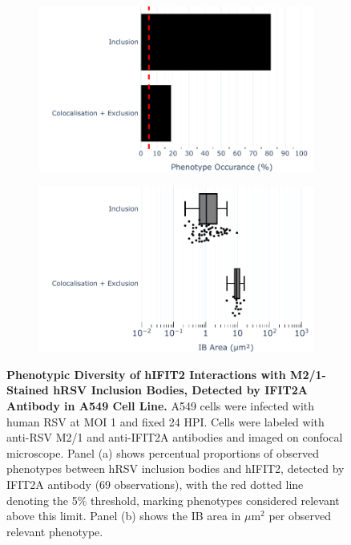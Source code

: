 \begin{figure}
    \begin{subfigure}{0.495\textwidth}
        \caption{}
        \includegraphics[width=1\linewidth]{08. Chapter 3/Figs/02. Infection/02. IFIT2/01. IFIT2A/07. bar_i2a_a549-m21.pdf} 
    \end{subfigure}
    \begin{subfigure}{0.495\textwidth}
        \caption{}
        \includegraphics[width=1\linewidth]{08. Chapter 3/Figs/02. Infection/02. IFIT2/01. IFIT2A/08. box_i2a_a549-m21.pdf}
    \end{subfigure}
    \caption[Phenotypic Diversity of hIFIT2 Interactions with M2/1-Stained hRSV Inclusion Bodies, Detected by IFIT2A Antibody in A549 Cell Line.]{\textbf{Phenotypic Diversity of hIFIT2 Interactions with M2/1-Stained hRSV Inclusion Bodies, Detected by IFIT2A Antibody in A549 Cell Line.} A549 cells were infected with human RSV at MOI 1 and fixed 24 HPI. Cells were labeled with anti-RSV M2/1 and anti-IFIT2A antibodies and imaged on confocal microscope. Panel (a) shows percentual proportions of observed phenotypes between hRSV inclusion bodies and hIFIT2, detected by IFIT2A antibody (69 observations), with the red dotted line denoting the 5\% threshold, marking phenotypes considered relevant above this limit. Panel (b) shows the IB area in \(\mu \mbox{m}^2\) per observed relevant phenotype.}
    \label{fig:Phenotypic Diversity of hIFIT2 Interactions with M2/1-Stained hRSV Inclusion Bodies, Detected by IFIT2A Antibody in A549 Cell Line}
\end{figure}

